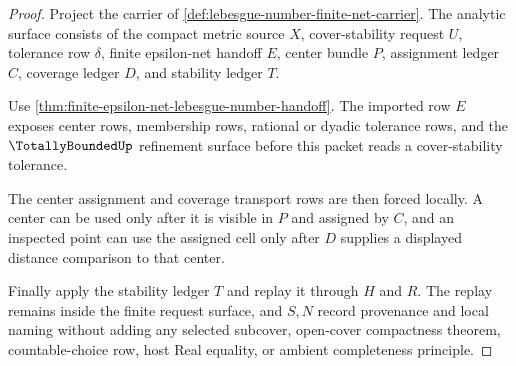 \begin{proof}
Project the carrier of \autoref{def:lebesgue-number-finite-net-carrier}. The analytic surface consists of the compact metric source $X$, cover-stability request $U$, tolerance row $\delta$, finite epsilon-net handoff $E$, center bundle $P$, assignment ledger $C$, coverage ledger $D$, and stability ledger $T$.

Use \autoref{thm:finite-epsilon-net-lebesgue-number-handoff}. The imported row $E$ exposes center rows, membership rows, rational or dyadic tolerance rows, and the $\TotallyBoundedUp$ refinement surface before this packet reads a cover-stability tolerance.

The center assignment and coverage transport rows are then forced locally. A center can be used only after it is visible in $P$ and assigned by $C$, and an inspected point can use the assigned cell only after $D$ supplies a displayed distance comparison to that center.

Finally apply the stability ledger $T$ and replay it through $H$ and $R$. The replay remains inside the finite request surface, and $S,N$ record provenance and local naming without adding any selected subcover, open-cover compactness theorem, countable-choice row, host Real equality, or ambient completeness principle.
\end{proof}

